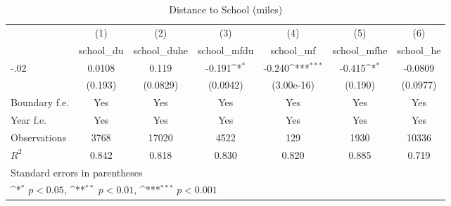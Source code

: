 \begin{table}[htbp]\centering
\def\sym#1{\ifmmode^{#1}\else\(^{#1}\)\fi}
\caption{Distance to School (miles)}
\begin{tabular}{l*{6}{c}}
\hline\hline
                    &\multicolumn{1}{c}{(1)}&\multicolumn{1}{c}{(2)}&\multicolumn{1}{c}{(3)}&\multicolumn{1}{c}{(4)}&\multicolumn{1}{c}{(5)}&\multicolumn{1}{c}{(6)}\\
                    &\multicolumn{1}{c}{school\_du}&\multicolumn{1}{c}{school\_duhe}&\multicolumn{1}{c}{school\_mfdu}&\multicolumn{1}{c}{school\_mf}&\multicolumn{1}{c}{school\_mfhe}&\multicolumn{1}{c}{school\_he}\\
\hline
-.02                &      0.0108         &       0.119         &      -0.191\sym{*}  &      -0.240\sym{***}&      -0.415\sym{*}  &     -0.0809         \\
                    &     (0.193)         &    (0.0829)         &    (0.0942)         &  (3.00e-16)         &     (0.190)         &    (0.0977)         \\
[1em]
Boundary f.e.       &         Yes         &         Yes         &         Yes         &         Yes         &         Yes         &         Yes         \\
[1em]
Year f.e.           &         Yes         &         Yes         &         Yes         &         Yes         &         Yes         &         Yes         \\
\hline
Observations        &        3768         &       17020         &        4522         &         129         &        1930         &       10336         \\
\(R^{2}\)           &       0.842         &       0.818         &       0.830         &       0.820         &       0.885         &       0.719         \\
\hline\hline
\multicolumn{7}{l}{\footnotesize Standard errors in parentheses}\\
\multicolumn{7}{l}{\footnotesize \sym{*} \(p<0.05\), \sym{**} \(p<0.01\), \sym{***} \(p<0.001\)}\\
\end{tabular}
\end{table}
